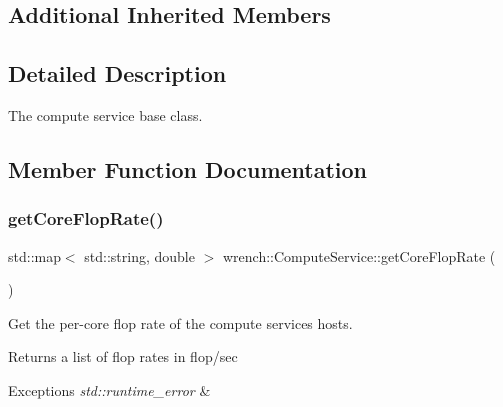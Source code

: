 \subsection*{Additional Inherited Members}


\subsection{Detailed Description}
The compute service base class. 

\subsection{Member Function Documentation}
\mbox{\label{classwrench_1_1_compute_service_a72c2608b82692ad73888d9b9f7c6bd0c}} 
\subsubsection{\texorpdfstring{get\+Core\+Flop\+Rate()}{getCoreFlopRate()}}
{\footnotesize\ttfamily std\+::map$<$ std\+::string, double $>$ wrench\+::\+Compute\+Service\+::get\+Core\+Flop\+Rate (\begin{DoxyParamCaption}{ }\end{DoxyParamCaption})}



Get the per-\/core flop rate of the compute service\textquotesingle{}s hosts. 

\begin{DoxyReturn}{Returns}
a list of flop rates in flop/sec
\end{DoxyReturn}

\begin{DoxyExceptions}{Exceptions}
{\em std\+::runtime\+\_\+error} & \\
\hline
\end{DoxyExceptions}
\mbox{\label{classwrench_1_1_compute_service_ac3662628f589ffe44e17921e60971fd6}} 
